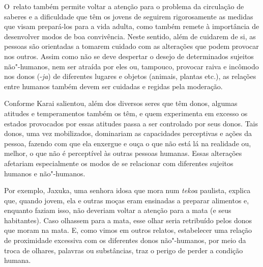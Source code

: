 O~relato também permite voltar a atenção para o problema da circulação
de saberes e a dificuldade que têm os jovens de seguirem rigorosamente
as medidas que visam prepará-los para a vida adulta, como também remete
à importância de desenvolver modos de boa convivência. Neste sentido,
além de cuidarem de si, as pessoas são orientadas a tomarem cuidado com
as alterações que podem provocar nos outros. Assim como não se deve
despertar o desejo de determinados sujeitos não"-humanos, nem ser
atraída por eles ou, tampouco, provocar raiva e incômodo nos donos
(-\emph{ja}) de diferentes lugares e objetos (animais, plantas etc.), as
relações entre humanos também devem ser cuidadas e regidas pela
moderação. 

Conforme Karai salientou, além dos diversos seres que têm donos, algumas
atitudes e temperamentos também os têm, e quem experimenta em excesso
os estados provocados por essas atitudes passa a ser controlado por
seus donos. Tais donos, uma vez mobilizados, dominariam as capacidades
perceptivas e ações da pessoa, fazendo com que ela enxergue e ouça o
que não está lá na realidade ou, melhor, o que não é perceptível às
outras pessoas humanas. Essas alterações afetariam especialmente os
modos de se relacionar com diferentes sujeitos humanos e não"-humanos.

Por exemplo, Jaxuka, uma senhora idosa que mora num \emph{tekoa} paulista,
explica que, quando jovem, ela e outras moças eram ensinadas a preparar
alimentos e, enquanto faziam isso, não deveriam voltar a atenção para a
mata (e seus habitantes). Caso olhassem para a mata, esse olhar seria
retribuído pelos donos que moram na mata. E, como vimos em outros
relatos, estabelecer uma relação de proximidade excessiva com os
diferentes donos não"-humanos, por meio da troca de olhares, palavras ou
substâncias, traz o perigo de perder a condição humana. 

\bigskip


